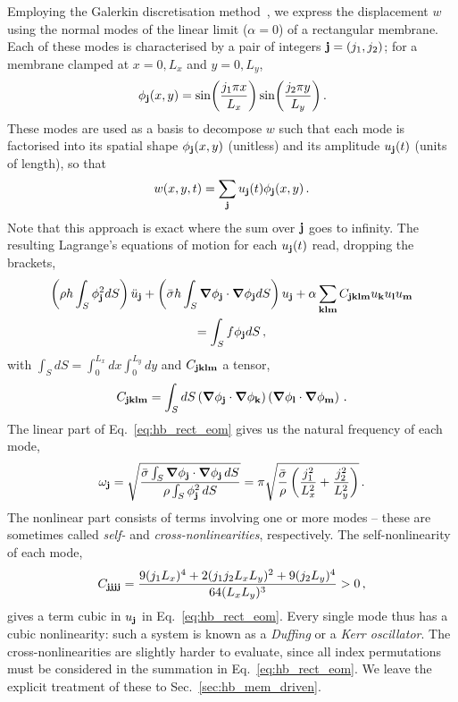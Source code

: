 Employing the Galerkin discretisation method~\cite{Nayfeh_Mook}, we express the displacement $w$ using the normal modes of the linear limit ($\alpha=0$) of a rectangular membrane. Each of these modes is characterised by a pair of integers $\vb{j} = (j_1, j_2)$; for a membrane clamped at $x = 0, L_x$ and $y = 0, L_y$,
\begin{equation} \label{eq:hb_rect_modes}
\phi_{\vb{j}}(x,y) = \sin(\frac{j_1 \pi x}{L_x}) \sin(\frac{j_2 \pi y}{L_y})\,.
\end{equation}
These modes are used as a basis to decompose $w$ such that each mode is factorised into its spatial shape $\phi_{\vb{j}}(x,y)$ (unitless) and its amplitude $u_{\vb{j}}(t)$ (units of length), so that 
\begin{equation}
w(x,y,t) = \sum_{\vb{j}} u_{\vb{j}}(t) \phi_{\vb{j}}(x,y)\,.
\end{equation}
Note that this approach is exact where the sum over $\vb{j}$ goes to infinity. The resulting Lagrange's equations of motion for each $u_{\vb{j}}(t)$ read, dropping the brackets,
\begin{multline} \label{eq:hb_rect_eom}
\left( \rho h \int_S \phi_{\vb{j}}^2 dS \right) \ddot{u}_{\vb{j}} + \left(\bar{\sigma} h \int_S \grad \phi_{\vb{j}} \cdot \grad \phi_{\vb{j}} dS \right) u_{\vb{j}} + \alpha \sum_{\vb{k} \vb{l} \vb{m}} C_{\vb{j} \vb{k} \vb{l} \vb{m}} u_{\vb{k}} u_{\vb{l}} u_{\vb{m}}\\ = \int_S f \phi_{\vb{j}} dS\,,
\end{multline}
with $ \int_S dS = \int_{0}^{L_x} dx \int_0^{L_y} dy$ and $C_{\vb{j} \vb{k} \vb{l} \vb{m}}$ a tensor,
\begin{equation} \label{eq:hb_rect_C}
C_{\vb{j} \vb{k} \vb{l} \vb{m}} = \int_S dS \left(\grad \phi_{\vb{j}} \cdot \grad \phi_{\vb{k}}  \right)  \left(\grad \phi_{\vb{l}} \cdot \grad \phi_{\vb{m}}  \right)\,.
\end{equation}
The linear part of Eq.~\eqref{eq:hb_rect_eom} gives us the natural frequency of each mode,
\begin{equation}
\omega_{\vb{j}}= \sqrt{\frac{\bar{\sigma} \int_S \grad \phi_{\vb{j}} \cdot \grad \phi_{\vb{j}}\, dS}{ \rho \int_S \phi_{\vb{j}}^2 \,dS}} = \pi \sqrt{ \frac{\bar{\sigma}}{\rho}  \left(\frac{j_1^2}{L_x^2} + \frac{j_2^2}{L_y^2} \right)} \,.
\end{equation}
The nonlinear part consists of terms involving one or more modes -- these are sometimes called \textit{self-} and \textit{cross-nonlinearities}, respectively. The self-nonlinearity of each mode, 
\begin{equation}
C_{\vb{j} \vb{j} \vb{j} \vb{j}} = \frac{9 (j_1 L_x)^4 + 2 (j_1 j_2 L_x L_y)^2 + 9 (j_2 L_y)^4}{64 (L_x L_y)^3} > 0 \,,
\end{equation}
gives a term cubic in $u_{\vb{j}}$ in Eq.~\eqref{eq:hb_rect_eom}. Every single mode thus has a cubic nonlinearity: such a system is known as a \textit{Duffing} or a \textit{Kerr oscillator}. The cross-nonlinearities are slightly harder to evaluate, since all index permutations must be considered in the summation in Eq.~\eqref{eq:hb_rect_eom}. We leave the explicit treatment of these to Sec.~\ref{sec:hb_mem_driven}.

